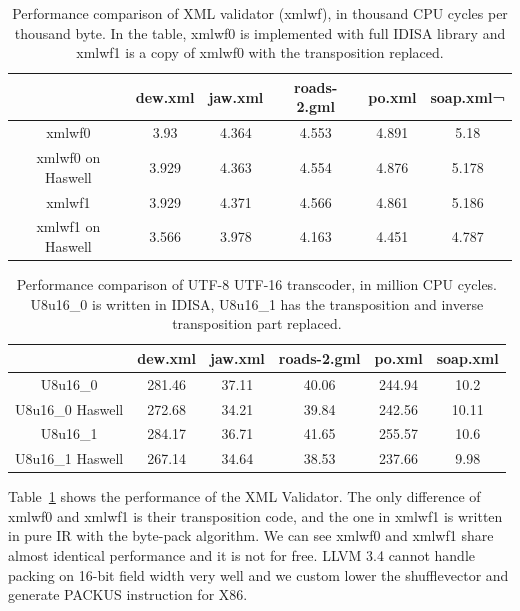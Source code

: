 \begin{table}[h]
\centering
\begin{tabular}{|c|c|c|c|c|c|}
\hline
        & dew.xml  &  jaw.xml  &  roads-2.gml  &  po.xml  & soap.xml¬ \\\hline
xmlwf0   &  3.93   &    4.364   &   4.553   &   4.891   &   5.18 \\ \hline
xmlwf0 on Haswell   &  3.929   &   4.363   &   4.554   &   4.876   &   5.178 \\ \hline

xmlwf1   &  3.929   &   4.371   &   4.566   &   4.861   &   5.186 \\ \hline
xmlwf1 on Haswell &   3.566   &   3.978   &   4.163   &   4.451   &   4.787 \\ \hline
\end{tabular}
\caption[Performance comparison of XML Validator (xmlwf)]{Performance comparison of XML validator (xmlwf), in thousand CPU cycles per thousand byte. In the table, xmlwf0 is implemented with full IDISA library and xmlwf1 is a copy of xmlwf0 with the transposition replaced.}
\label{table:xmlwf_perf}
\end{table}

\begin{table}[h]
\centering
\begin{tabular}{|c|c|c|c|c|c|}
\hline
 & dew.xml & jaw.xml & roads-2.gml & po.xml & soap.xml \\ \hline
 U8u16\_0         & 281.46  & 37.11   & 40.06       & 244.94 & 10.2     \\ \hline
 U8u16\_0 Haswell & 272.68  & 34.21   & 39.84       & 242.56 & 10.11    \\ \hline
 U8u16\_1         & 284.17  & 36.71   & 41.65       & 255.57 & 10.6     \\ \hline
 U8u16\_1 Haswell & 267.14  & 34.64   & 38.53       & 237.66 & 9.98     \\ \hline
 \end{tabular}
 \caption[Performance comparison of UTF-8 UTF-16 Transcoder]{Performance comparison of UTF-8 UTF-16 transcoder, in million CPU cycles. U8u16\_0 is written in IDISA, U8u16\_1 has the transposition and inverse transposition part replaced.}
 \label{table:u8u16_perf}
 \end{table}

Table~\ref{table:xmlwf_perf} shows the performance of the XML Validator. The only difference of xmlwf0 and xmlwf1 is their transposition code, and the one in xmlwf1 is written in pure IR with the byte-pack algorithm. We can see xmlwf0 and xmlwf1 share almost identical performance and it is not for free. LLVM 3.4 cannot handle packing on 16-bit field width very well and we custom lower the shufflevector and generate PACKUS instruction for X86.

